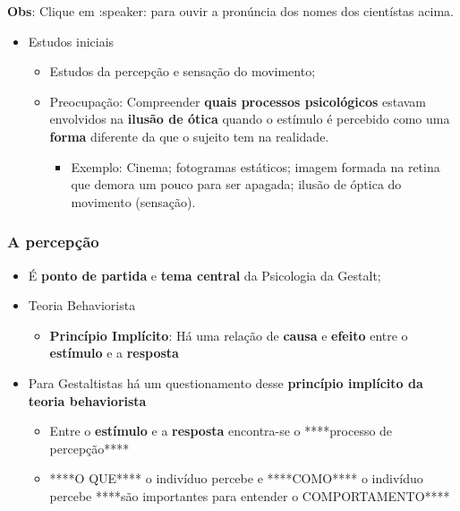 \documentclass[
]{book}
\providecommand{\tightlist}{%
  \setlength{\itemsep}{0pt}\setlength{\parskip}{0pt}}
\begin{document}
\textbf{Obs}: Clique em :speaker: para ouvir a pronúncia dos nomes dos cientístas acima.

\begin{itemize}
\tightlist
\item
  Estudos iniciais

  \begin{itemize}
  \tightlist
  \item
    Estudos da percepção e sensação do movimento;
  \item
    Preocupação: Compreender \textbf{quais processos psicológicos} estavam envolvidos na \textbf{ilusão de ótica} quando o estímulo é percebido como uma \textbf{forma} diferente da que o sujeito tem na realidade.

    \begin{itemize}
    \tightlist
    \item
      Exemplo: Cinema; fotogramas estáticos; imagem formada na retina que demora um pouco para ser apagada; ilusão de óptica do movimento (sensação).
    \end{itemize}
  \end{itemize}
\end{itemize}

\hypertarget{a-percepuxe7uxe3o}{%
\subsubsection{A percepção}\label{a-percepuxe7uxe3o}}

\begin{itemize}
\tightlist
\item
  É \textbf{ponto de partida} e \textbf{tema central} da Psicologia da Gestalt;
\item
  Teoria Behaviorista

  \begin{itemize}
  \tightlist
  \item
    \textbf{Princípio Implícito}: Há uma relação de \textbf{causa} e \textbf{efeito} entre o \textbf{estímulo} e a \textbf{resposta}
  \end{itemize}
\item
  Para Gestaltistas há um questionamento desse \textbf{princípio implícito da teoria behaviorista}

  \begin{itemize}
  \tightlist
  \item
    Entre o \textbf{estímulo} e a \textbf{resposta} encontra-se o ****processo de percepção****
  \item
    ****O QUE**** o indivíduo percebe e ****COMO**** o indivíduo percebe ****são importantes para entender o COMPORTAMENTO****
  \end{itemize}
\end{itemize}
\end{document}
